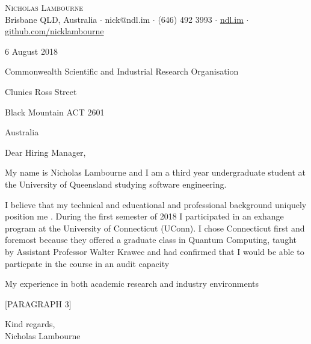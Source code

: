 \documentclass[a4paper]{article}
\begin{document}
\vspace*{-50pt}

\begin{center}
	{\Huge \scshape {Nicholas Lambourne}}\\
	\vspace{3pt}
	\small Brisbane QLD, Australia $\cdot$ nick@ndl.im $\cdot$ (646) 492 3993 $\cdot$ \href{https://ndl.im}{ndl.im} $\cdot$ \href{https://github.com/nicklambourne}{github.com/nicklambourne}\\
	\hrulefill
\end{center}

\vspace{30pt}

6 August 2018

\vspace{40pt}

Commonwealth Scientific and Industrial Research Organisation

Clunies Ross Street

Black Mountain ACT 2601

Australia

\vspace{40pt}

Dear Hiring Manager,

\vspace{40pt}

My name is Nicholas Lambourne and I am a third year undergraduate student at the University of Queensland studying software engineering. \\

\vspace{12pt}

I believe that my technical and educational and professional background uniquely position me . During the first semester of 2018 I participated in an exhange program at the University of Connecticut (UConn).
 I chose Connecticut first and foremost because they offered a graduate class in Quantum Computing, taught by Assistant Professor Walter Krawec and had confirmed that I would be able to particpate in the course in an audit capacity

My experience in both academic research and industry environments

[PARAGRAPH 3]

\vspace{40pt}

Kind regards, \\

Nicholas Lambourne
\end{document}
